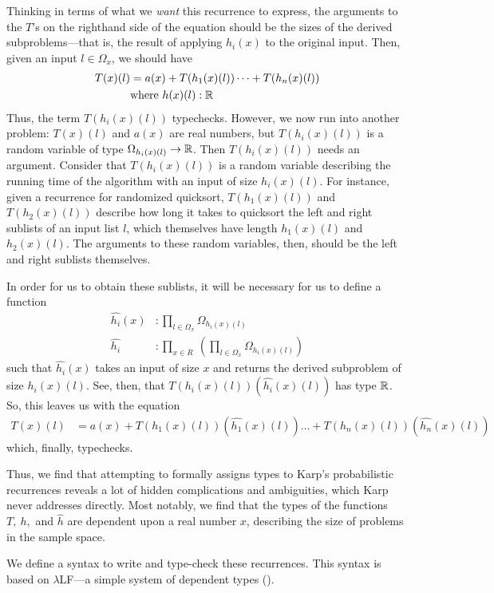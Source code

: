 Thinking in terms of what we \emph{want} this recurrence to express, the arguments to the $T$'s on the righthand side of
the equation should be the sizes of the derived subproblems---that is, the result of applying $h_i(x)$ to the original input.
Then, given an input $l \in \Omega_x$, we should have
\begin{align*}
T(x)(l) &= a(x) + T(h_1(x)(l)) \dots + T(h_n(x)(l)) \\
&\text{where } h(x)(l) : \mathbb{R} 
\end{align*}
 Thus, the term $T(h_i(x)(l))$ typechecks. However, we now run into another problem: $T(x)(l)$ and $a(x)$ are real numbers,
but $T(h_i(x)(l))$ is a random variable of type $\Omega_{h_i(x)(l)} \rightarrow \mathbb{R}$. Then $T(h_i(x)(l))$ needs an argument.
Consider that $T(h_i(x)(l))$ is a random variable describing the running time of the algorithm with an input of size 
$h_i(x)(l)$. For instance, given a recurrence for randomized quicksort, $T(h_1(x)(l))$ and $T(h_2(x)(l))$ describe how long it 
takes to quicksort the left and right sublists of an input list $l$, which themselves have length $h_1(x)(l)$ and
$h_2(x)(l)$. The arguments to these random variables, then, should be the left and right sublists themselves. 

 In order for us to obtain these sublists, it will be necessary for us to define a function 
 \begin{align*}
 \hat{h_i}(x) &: \prod_{l \in \Omega_x} \Omega_{h_i(x)(l)} \\
 \hat{h_i} &: \prod_{x \in R} \ ( \prod_{l \in \Omega_x} \Omega_{h_i(x)(l)})
 \end{align*}
 such that $\hat{h_i}(x)$ takes an input of size $x$ and returns the derived subproblem of size $h_i(x)(l)$. See, then, that
 $T(h_i(x)(l))(\hat{h_i}(x)(l))$ has type $\mathbb{R}$. So, this leaves us with the equation
 \begin{align*}
 T(x)(l) &= a(x) + T(h_1(x)(l))(\hat{h_1}(x)(l)) \dots + T(h_n(x)(l))(\hat{h_n}(x)(l))
 \end{align*}
 which, finally, typechecks.
 
 Thus, we find that attempting to formally assigns types to Karp's probabilistic recurrences reveals a lot of hidden 
 complications and ambiguities, which Karp never addresses directly. Most notably, we find that the types of the 
 functions $T, \ h,$ and $\hat{h}$ are dependent upon a real number $x$, describing the size of problems in the sample space.
 
We define a syntax to write and type-check these recurrences. This syntax is based on $\lambda$LF---a simple system of 
dependent types (\cite{Pierce:2005aa}).
 
